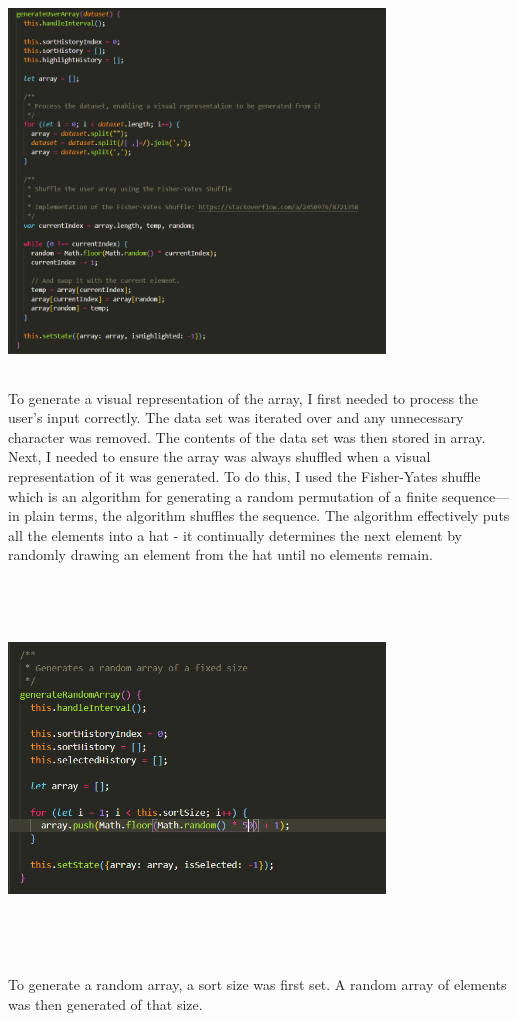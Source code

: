 \begin{center}
    \includegraphics[width=10cm,height=10cm,keepaspectratio]{images/mainpage4}
\end{center}
To generate a visual representation of the array, I first needed to process the user's input correctly. The data set was iterated over and any unnecessary character was removed. The contents of the data set was then stored in array. Next, I needed to ensure the array was always shuffled when a visual representation of it was generated. To do this, I used the Fisher-Yates shuffle which is an algorithm for generating a random permutation of a finite sequence—in plain terms, the algorithm shuffles the sequence. The algorithm effectively puts all the elements into a hat - it continually determines the next element by randomly drawing an element from the hat until no elements remain.
\par
\bigskip
\begin{center}
    \includegraphics[width=10cm,height=10cm,keepaspectratio]{images/mainpage5}
\end{center}
To generate a random array, a sort size was first set. A random array of elements was then generated of that size.

